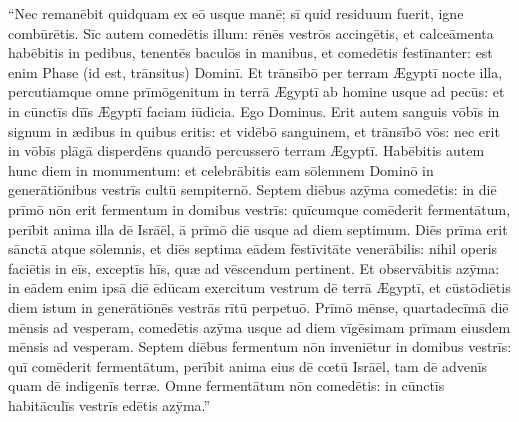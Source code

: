 ``Nec remanēbit quidquam ex eō usque manē; sī quid
residuum fuerit, igne
combūrētis. Sīc autem comedētis illum:
rēnēs vestrōs accingētis, et
calceāmenta habēbitis in pedibus,
tenentēs baculōs in manibus, et comedētis festīnanter: est
enim Phase (id est, trānsitus) Dominī. Et trānsībō per
terram Ægyptī nocte illa, percutiamque omne prīmōgenitum in
terrā Ægyptī ab homine usque ad pecūs: et in cūnctīs dīīs Ægyptī faciam
iūdicia. Ego Dominus. Erit autem sanguis vōbīs in signum
in ædibus in quibus eritis: et vidēbō sanguinem, et
trānsībō vōs: nec erit in vōbīs plāgā
disperdēns quandō percusserō terram Ægyptī. Habēbitis
autem hunc diem in monumentum: et
celebrābitis eam sōlemnem Dominō in
generātiōnibus vestrīs cultū sempiternō.
Septem diēbus azȳma comedētis: in diē prīmō nōn erit
fermentum in domibus vestrīs: quīcumque comēderit
fermentātum, perībit anima illa dē Isrāēl, ā prīmō diē
usque ad diem septimum. Diēs prīma erit sānctā atque
sōlemnis, et diēs septima eādem fēstīvitāte
venerābilis: nihil operis faciētis in eīs,
exceptīs hīs, quæ ad vēscendum pertinent. Et
observābitis azȳma: in eādem enim ipsā diē ēdūcam
exercitum vestrum dē terrā Ægyptī, et cūstōdiētis diem istum in
generātiōnēs vestrās rītū perpetuō.
 Prīmō mēnse, quartadecīmā diē mēnsis ad vesperam, comedētis
azȳma usque ad diem vīgēsimam prīmam eiusdem mēnsis ad
vesperam. Septem diēbus fermentum nōn inveniētur in domibus vestrīs:
quī comēderit fermentātum, perībit anima eius dē cœtū Isrāēl, tam dē
advenīs quam dē indigenīs terræ. Omne fermentātum nōn
comedētis: in cūnctīs habitāculīs vestrīs edētis azȳma.''

